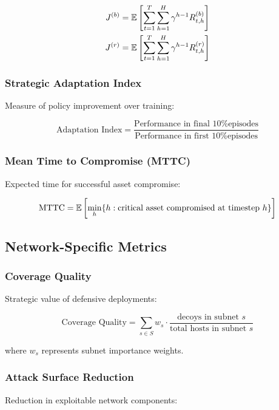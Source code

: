 \documentclass[11pt]{article}
\theoremstyle{definition}
\theoremstyle{plain}
\begin{document}
\begin{align}
J^{(b)} &= \mathbb{E}\left[\sum_{t=1}^{T} \sum_{h=1}^{H} \gamma^{h-1} R_{t,h}^{(b)}\right] \\
J^{(r)} &= \mathbb{E}\left[\sum_{t=1}^{T} \sum_{h=1}^{H} \gamma^{h-1} R_{t,h}^{(r)}\right]
\end{align}

\subsubsection{Strategic Adaptation Index}
Measure of policy improvement over training:

\begin{equation}
\text{Adaptation Index} = \frac{\text{Performance in final 10\% episodes}}{\text{Performance in first 10\% episodes}}
\end{equation}

\subsubsection{Mean Time to Compromise (MTTC)}
Expected time for successful asset compromise:

\begin{equation}
\text{MTTC} = \mathbb{E}\left[\min_h \{h : \text{critical asset compromised at timestep } h\}\right]
\end{equation}

\subsection{Network-Specific Metrics}

\subsubsection{Coverage Quality}
Strategic value of defensive deployments:

\begin{equation}
\text{Coverage Quality} = \sum_{s \in S} w_s \cdot \frac{\text{decoys in subnet } s}{\text{total hosts in subnet } s}
\end{equation}

where $w_s$ represents subnet importance weights.

\subsubsection{Attack Surface Reduction}
Reduction in exploitable network components:
\end{document}
